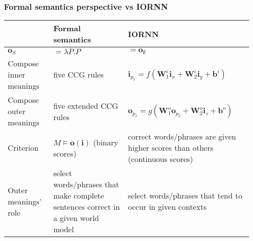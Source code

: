 \documentclass[10pt,handout]{beamer}
\begin{document}
\begin{frame}
\frametitle{Formal semantics perspective vs IORNN}
\begin{table}\footnotesize
\begin{tabular}{p{2cm}|p{4cm}|p{4cm}}
	\hline
	 & Formal semantics & IORNN \\ \hline
	 $\mathbf{o}_{S}$ & $=\lambda P.P$ & $=\mathbf{o}_{\emptyset}$ \\ \hline \pause
	 Compose inner meanings & five CCG rules & $\mathbf{i}_{p_1} = f(\mathbf{W}_1^i \mathbf{i}_{x} + \mathbf{W}_2^i \mathbf{i}_{y} + \mathbf{b}^i)$ \\ \hline \pause
	 Compose outer meanings & five extended CCG rules & $\mathbf{o}_{p_1} = g(\mathbf{W}_1^o \mathbf{o}_{p_2} + \mathbf{W}_2^o \mathbf{i}_{z} + \mathbf{b}^o)$ \\ \hline \pause
	 Criterion & $M \models \mathbf{o}(\mathbf{i})$ (binary scores) & correct words/phrases are given higher scores than others (continuous scores) \\ \hline \pause
	 Outer meanings' role & select words/phrases that make complete sentences correct in a given world model & select words/phrases that tend to occur in given contexts \\ \hline
	 
\end{tabular}
\end{table}
\end{frame}
\end{document}
